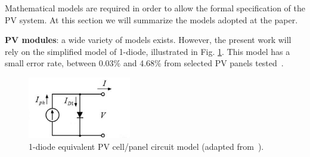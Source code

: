\documentclass[review]{elsarticle}
\begin{document}
%
%
% 
Mathematical models are required in order to allow the formal specification of the PV system. At this section we will summarize the models adopted at the paper.

\textbf{PV modules}: a wide variety of models exists. %
However, the present work will rely on the simplified model of 1-diode, illustrated in Fig. \ref{fig:equivckt}. This model has a small error rate, between 0.03\% and 4.68\% from selected PV panels tested~\citep{Saloux}.

\begin{figure}[h]
\includegraphics[width=0.40\textwidth]{equivckt1D}
\centering
\caption{1-diode equivalent PV cell/panel circuit model (adapted from~\citep{Cubas}).}
\label{fig:equivckt}
\end{figure}
\end{document}
